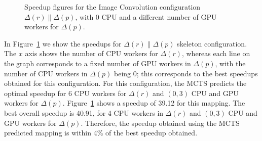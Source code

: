 \documentclass[smallextended]{svjour3}
\begin{document}
\begin{figure}[t]
\begin{center}
\caption{Speedup figures for the Image Convolution configuration
  $\Delta(r) \parallel \Delta(p)$, with 0 CPU and a different number of
  GPU workers for $\Delta(p)$.}
\label{ver2}
\end{center}
\end{figure}
In Figure~\ref{ver2} we show the speedups for $\Delta(r) \parallel
\Delta(p)$ skeleton configuration. The $x$ axis shows the number of CPU
workers for $\Delta(r)$, whereas each line on the graph corresponds to
a fixed number of GPU workers in $\Delta(p)$, with the number of CPU
workers in $\Delta(p)$ being 0; this corresponds to the best speedups
obtained for this configuration.
For this configuration, the MCTS predicts the optimal speedup for 6
CPU workers for $\Delta(r)$ and $(0,3)$ CPU and GPU workers for
$\Delta(p)$. Figure~\ref{ver2} shows a speedup of 39.12 for this
mapping. The best overall speedup is 40.91, for  4 CPU workers in $\Delta(r)$
and $(0,3)$ CPU and GPU workers for $\Delta(p)$. Therefore, the speedup obtained
using the MCTS predicted mapping is within 4\% of the best speedup
obtained.  
\end{document}
